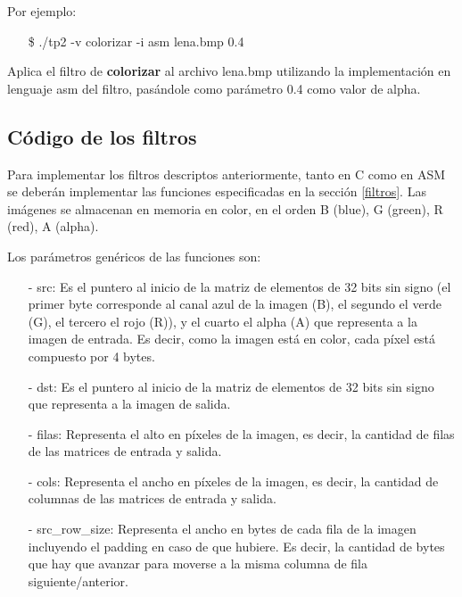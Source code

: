 \documentclass[a4paper, 12pt]{article}
\newcommand{\code}[1]{{\sffamily #1}\xspace}
\begin{document}
\vspace*{0.3cm}
\noindent Por ejemplo:
\vspace*{-0.2cm}
\begin{itemize}
    \item [\code{\$}]
        \code{./tp2 -v colorizar -i asm lena.bmp 0.4}
\end{itemize}

\noindent Aplica el filtro de \textbf{colorizar} al archivo lena.bmp
utilizando la implementación en lenguaje asm del filtro, pasándole como parámetro 0.4 como valor de alpha.

\subsection{Código de los filtros}

Para implementar los filtros descriptos anteriormente, tanto en C como
en ASM se deberán implementar las funciones especificadas en la sección
\ref{filtros}.
Las imágenes se almacenan en memoria en color, en el orden
B (blue), G (green), R (red), A (alpha).

Los parámetros genéricos de las funciones son:
\begin{itemize}
  \itemsep0em
  \item[-]
      \code{src}\rmfamily: Es el puntero al inicio de la matriz de
      elementos de 32 bits sin signo (el primer byte corresponde al canal azul
      de la imagen (B), el segundo el verde (G), el tercero el rojo (R)), y el
      cuarto el alpha (A) que
      representa a la imagen de entrada. Es decir, como la imagen está en
      color, cada píxel está compuesto por 4 bytes.

   \item[-]
      \code{dst}\rmfamily: Es el puntero al inicio de la matriz de
      elementos de 32 bits sin signo que representa a la imagen de salida.

   \item[-]
      \code{filas}\rmfamily: Representa el alto en píxeles de la imagen, es
      decir, la cantidad de filas de las matrices de entrada y salida.

   \item[-]
      \code{cols}\rmfamily: Representa el ancho en píxeles de la imagen, es
      decir, la cantidad de columnas de las matrices de entrada y salida.

   \item[-]
      \code{src\_row\_size}\rmfamily: Representa el ancho en bytes de cada fila
      de la imagen incluyendo el padding en caso de que hubiere. Es decir, la cantidad de bytes que hay que avanzar para moverse a la misma columna de fila siguiente/anterior.
\end{itemize}
\end{document}

